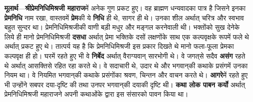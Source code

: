 \begin{sloppypar}\justifying{}
\textbf{मूलार्थ}—\textbf{श्रीप्रेमनिधि\-मिश्रजी महाराज}में अनेक गुण प्रकट हुए। वह ब्राह्मण धन्यवादका पात्र है जिसने इनका \textbf{प्रेमनिधि} नाम रखा, वास्तवमें \textbf{प्रेम}की ये \textbf{निधि} ही थे, सागर ही थे। उनका शील अर्थात् चरित्र और स्वभाव बहुत सुन्दर था। प्रेमनिधि\-मिश्रजीकी वाणी बड़ी मधुर और मङ्गल करनेवाली थी। भक्तोंको सुख देनेके लिये ही मानो प्रेमनिधि\-मिश्रजी \textbf{दसधा} अर्थात् प्रेमा भक्तिके दसों लक्षणोंके साथ एक कल्पवृक्षके रूपमें फले थे अर्थात् प्रकट हुए थे। तात्पर्य यह है कि प्रेमनिधि\-मिश्रजी इस प्रकार दिखते थे मानो फला-फूला प्रेमका कल्पवृक्ष ही हो। घरमें रहते हुए भी वे \textbf{निर्बेद} अर्थात् वैराग्यवान् सारभोगी थे। वे जगत्‌से सदैव \textbf{असंग} रहते थे अर्थात् आसक्तिसे रहित रहा करते थे। वे सदाचारी थे, उदार थे और भगवान्‌की कथाके प्रसंगमें उनका नियम था। वे नियमित भगवान्‌की कथाके प्रसंगोंका श्रवण, चिन्तन और वाचन करते थे। \textbf{आगरे}में रहते हुए भी उन्होंने सबपर दया-दृष्टि की तथा उनपर भगवान्‌की दयाकी दृष्टि थी। \textbf{कथा लोक पाबन कर्यो} अर्थात् प्रेमनिधि\-मिश्रजी महाराजने अपनी कथाओंके द्वारा इस संसारको पावन किया था।
\end{sloppypar}


